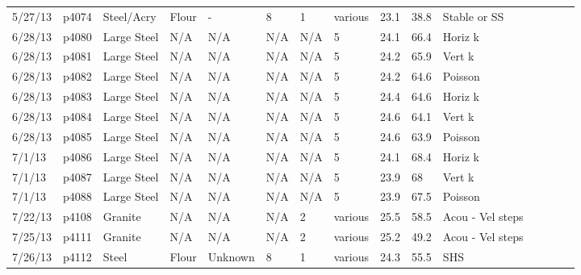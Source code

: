 \begin{landscape}
\begin{longtable} {lllllllllllllll}
5/27/13  & p4074      & Steel/Acry    & Flour        & -            & 8         & 1             & various                      & 23.1        & 38.8     & Stable or SS\\
6/28/13  & p4080      & Large Steel      & N/A          & N/A          & N/A       & N/A           & 5                            & 24.1        & 66.4     & Horiz k\\
6/28/13  & p4081      & Large Steel      & N/A          & N/A          & N/A       & N/A           & 5                            & 24.2        & 65.9     & Vert k\\
6/28/13  & p4082      & Large Steel      & N/A          & N/A          & N/A       & N/A           & 5                            & 24.2        & 64.6     & Poisson\\
6/28/13  & p4083      & Large Steel      & N/A          & N/A          & N/A       & N/A           & 5                            & 24.4        & 64.6     & Horiz k\\
6/28/13  & p4084      & Large Steel      & N/A          & N/A          & N/A       & N/A           & 5                            & 24.6        & 64.1     & Vert k\\
6/28/13  & p4085      & Large Steel      & N/A          & N/A          & N/A       & N/A           & 5                            & 24.6        & 63.9     & Poisson\\
7/1/13   & p4086      & Large Steel      & N/A          & N/A          & N/A       & N/A           & 5                            & 24.1        & 68.4     & Horiz k\\
7/1/13   & p4087      & Large Steel      & N/A          & N/A          & N/A       & N/A           & 5                            & 23.9        & 68       & Vert k\\
7/1/13   & p4088      & Large Steel      & N/A          & N/A          & N/A       & N/A           & 5                            & 23.9        & 67.5     & Poisson\\
7/22/13  & p4108      & Granite          & N/A          & N/A          & N/A       & 2             & various                      & 25.5        & 58.5     & Acou - Vel steps\\
7/25/13  & p4111      & Granite          & N/A          & N/A          & N/A       & 2             & various                      & 25.2        & 49.2     & Acou - Vel steps\\
7/26/13  & p4112      & Steel            & Flour        & Unknown      & 8         & 1             & various                      & 24.3        & 55.5     & SHS\\

\end{longtable}
\end{landscape}
